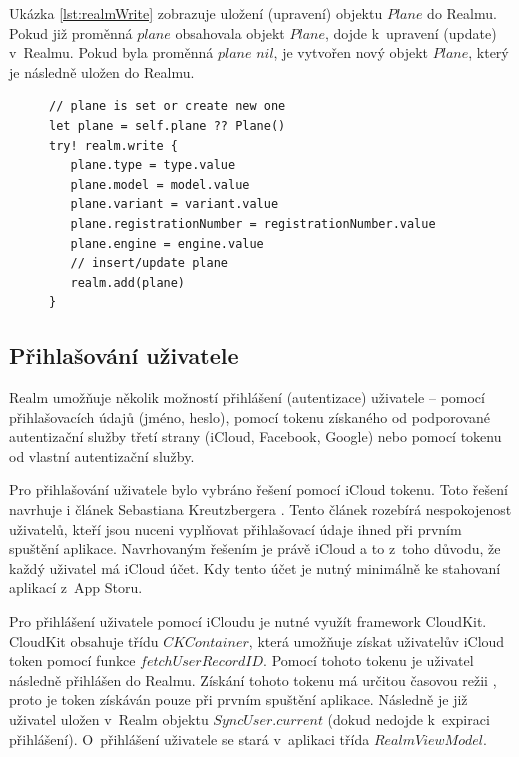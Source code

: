 \documentclass[thesis=M,czech]{FITthesis}[2012/06/26]
\begin{document}
Ukázka \ref{lst:realmWrite} zobrazuje uložení (upravení) objektu $Plane$ do Realmu. Pokud již proměnná $plane$ obsahovala objekt $Plane$, dojde k~upravení (update) v~Realmu. Pokud byla proměnná $plane$ $nil$, je vytvořen nový objekt $Plane$, který je následně uložen do Realmu.

\begin{figure}
\begin{minipage}{\linewidth}
\begin{lstlisting}[caption={Ukázka zápisu/úpravy Realm objektu},label={lst:realmWrite}]
// plane is set or create new one
let plane = self.plane ?? Plane()
try! realm.write {
   plane.type = type.value
   plane.model = model.value
   plane.variant = variant.value
   plane.registrationNumber = registrationNumber.value
   plane.engine = engine.value
   // insert/update plane      
   realm.add(plane)
}
\end{lstlisting}
\end{minipage}
\end{figure}
	
\subsection{Přihlašování uživatele}
\label{chap:login}
Realm umožňuje několik možností přihlášení (autentizace) uživatele -- pomocí přihlašovacích údajů (jméno, heslo), pomocí tokenu získaného od podporované autentizační služby třetí strany (iCloud, Facebook, Google) nebo pomocí tokenu od vlastní autentizační služby. \cite{realmDocs}

Pro přihlašování uživatele bylo vybráno řešení pomocí iCloud tokenu. Toto řešení navrhuje i článek Sebastiana Kreutzbergera \cite{loginUX}. Tento článek rozebírá nespokojenost uživatelů, kteří jsou nuceni vyplňovat přihlašovací údaje ihned při prvním spuštění aplikace. Navrhovaným řešením je právě iCloud a to z~toho důvodu, že každý uživatel má iCloud účet.  Kdy tento účet je nutný minimálně ke stahovaní aplikací z~App Storu.

Pro přihlášení uživatele pomocí iCloudu je nutné využít framework CloudKit. CloudKit obsahuje třídu $CKContainer$, která umožňuje získat uživatelův iCloud token pomocí funkce $fetchUserRecordID$. \cite{ckcontainer} Pomocí tohoto tokenu je uživatel následně přihlášen do Realmu. Získání tohoto tokenu má určitou časovou režii \cite{ckcontainer}, proto je token získáván pouze při prvním spuštění aplikace. Následně je již uživatel uložen v~Realm objektu $SyncUser.current$ (dokud nedojde k~expiraci přihlášení). O~přihlášení uživatele se stará v~aplikaci třída $RealmViewModel$.
\end{document}
